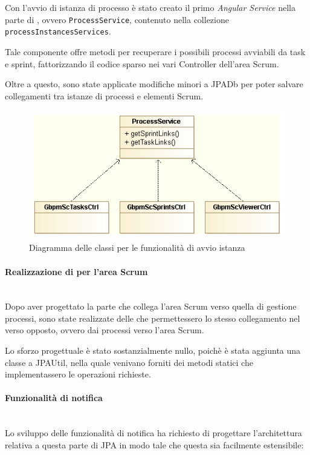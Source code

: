 Con l'avvio di istanza di processo è stato creato il primo \emph{Angular
Service} nella parte di \FREND{}, ovvero \texttt{ProcessService}, contenuto
nella collezione \texttt{processInstancesServices}.

Tale componente offre metodi per recuperare i possibili processi avviabili da
task e sprint, fattorizzando il codice sparso nei vari Controller dell'area
Scrum.

Oltre a questo, sono state applicate modifiche minori a JPADb per poter salvare
collegamenti tra istanze di processi e elementi Scrum.

\begin{figure}[H]%
\centering
\includegraphics[width=.8\columnwidth]{immagini/ProcessService}
\caption{Diagramma delle classi per le funzionalità di avvio istanza}
\label{fig:inst-start-cd}%
\end{figure}

\paragraph{Realizzazione di  per l'area Scrum} \mbox{} \\

Dopo aver progettato la parte che collega l'area Scrum verso quella di gestione
processi, sono state realizzate delle  che permettessero lo stesso
collegamento nel verso opposto, ovvero dai processi verso l'area Scrum.

Lo sforzo progettuale è stato sostanzialmente nullo, poichè è stata aggiunta
una classe a JPAUtil, nella quale venivano forniti dei metodi statici che
implementassero le operazioni richieste.

\paragraph{Funzionalità di notifica} \mbox{} \\

Lo sviluppo delle funzionalità di notifica ha richiesto di progettare
l'architettura relativa a questa parte di JPA in modo tale che questa sia
facilmente estensibile:

